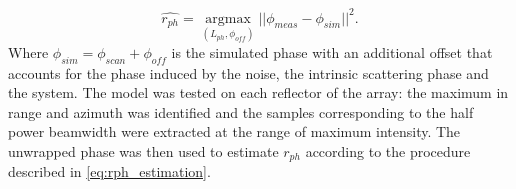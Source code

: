 \begin{equation}\label{eq:rph_estimation}
	\hat{r_{ph}} = \underset{\left(L_{ph}, \phi_{off}\right)}{\operatorname{argmax}}{\vert\vert\phi_{meas} - \phi_{sim}\vert\vert}^2.
\end{equation}
Where $\phi_{sim} = \phi_{scan} + \phi_{off}$ is the simulated phase with an additional offset that accounts for the phase induced by the noise, the intrinsic scattering phase and the system.
The model was tested on each reflector of the array: the maximum in range and azimuth was identified and the samples corresponding to the half power beamwidth were extracted at the range of maximum intensity. The unwrapped phase was then used to estimate $r_{ph}$ according to the procedure described in \autoref{eq:rph_estimation}.

